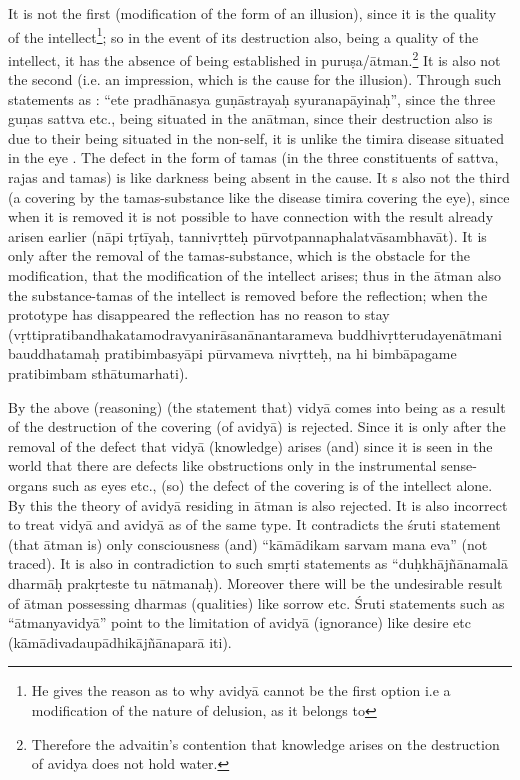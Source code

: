 It is not the first (modification of the form of an illusion), since it is the quality of the intellect\footnote{He gives the reason as to why avidyā cannot be the first option i.e a modification of the nature of delusion, as it belongs to}; so in the event of its destruction also, being a quality of the intellect, it has the absence of being established in puruṣa/ātman.\footnote{Therefore the advaitin’s contention that knowledge arises on the destruction of avidya does not hold water.} It is also not the second (i.e. an impression,   which is the cause for the illusion). Through such statements as : “ete pradhānasya guṇāstrayaḥ syuranapāyinaḥ”, since the three guṇas sattva etc.,  being situated in the anātman, since their destruction  also is due to  their being situated in the non-self, it is unlike the timira disease situated in the eye . The defect in the form of tamas (in the three constituents of sattva, rajas and tamas) is like darkness being absent in the cause. It s also not the third (a covering by the tamas-substance like the disease timira covering the eye), since when it is removed it is not possible to have connection with the result already arisen earlier (nāpi tṛtīyaḥ, tannivṛtteḥ pūrvotpannaphalatvāsambhavāt). It is only after the removal of the tamas-substance, which is the obstacle for the modification, that the modification of the intellect arises; thus in the ātman also the substance-tamas of the intellect is removed before the reflection; when the prototype has disappeared the reflection has no reason to stay (vṛttipratibandhakatamodravyanirāsanānantarameva buddhivṛtterudayenātmani bauddhatamaḥ pratibimba\-syāpi pūrvameva nivṛtteḥ, na hi bimbāpagame pratibimbam sthātumarhati).  

By the above (reasoning) (the statement that) vidyā comes into being as a result of the destruction of the covering (of avidyā) is rejected. Since it is only after the removal of the defect that vidyā (knowledge) arises (and) since it is seen in the world that there are defects like obstructions only in the instrumental sense-organs such as eyes etc., (so) the defect of the covering is of the intellect alone. By this the theory of avidyā residing in ātman is also rejected. It is also incorrect to treat vidyā and avidyā as of the same type. It contradicts the śruti statement (that ātman is) only consciousness (and) “kāmādikam sarvam mana eva” (not traced). It is also in contradiction to such smṛti statements as “duḥkhājñānamalā dharmāḥ prakṛteste tu nātmanaḥ). Moreover there will be the undesirable result of ātman possessing dharmas (qualities) like sorrow etc. Śruti statements such as “ātmanyavidyā” point to the limitation of avidyā (ignorance) like desire etc (kāmādivadaupādhikājñānaparā iti).


